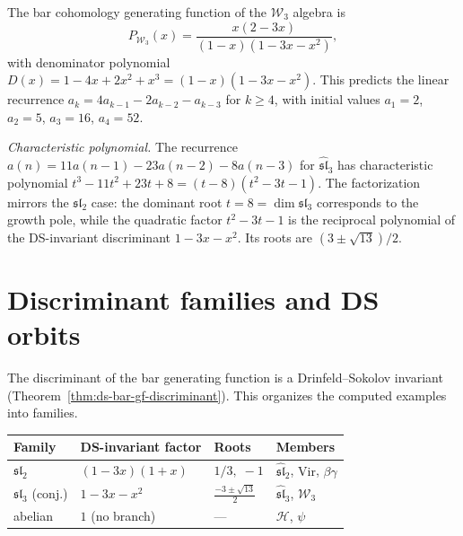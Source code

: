 \begin{conjecture}\label{conj:w3-bar-gf}
The bar cohomology generating function of the $\mathcal{W}_3$ algebra is
\[
P_{\mathcal{W}_3}(x) = \frac{x(2-3x)}{(1-x)(1-3x-x^2)},
\]
with denominator polynomial $D(x) = 1 - 4x + 2x^2 + x^3 = (1-x)(1-3x-x^2)$.  This predicts the linear recurrence $a_k = 4a_{k-1} - 2a_{k-2} - a_{k-3}$ for $k \geq 4$, with initial values $a_1 = 2$, $a_2 = 5$, $a_3 = 16$, $a_4 = 52$.
\end{conjecture}

\emph{Characteristic polynomial.}
The recurrence $a(n) = 11a(n{-}1) - 23a(n{-}2) - 8a(n{-}3)$ for $\widehat{\mathfrak{sl}}_3$ has characteristic polynomial $t^3 - 11t^2 + 23t + 8 = (t-8)(t^2-3t-1)$.  The factorization mirrors the $\mathfrak{sl}_2$ case: the dominant root $t = 8 = \dim\mathfrak{sl}_3$ corresponds to the growth pole, while the quadratic factor $t^2 - 3t - 1$ is the reciprocal polynomial of the DS-invariant discriminant $1 - 3x - x^2$.  Its roots are $(3 \pm \sqrt{13})/2$.

\section{Discriminant families and DS orbits}
\label{sec:discriminant-families}

The discriminant of the bar generating function is a Drinfeld--Sokolov invariant (Theorem~\ref{thm:ds-bar-gf-discriminant}).  This organizes the computed examples into families.

\begin{center}
\renewcommand{\arraystretch}{1.4}
\begin{tabular}{llll}
\toprule
\textbf{Family} & \textbf{DS-invariant factor} & \textbf{Roots} & \textbf{Members} \\
\midrule
$\mathfrak{sl}_2$ & $(1-3x)(1+x)$ & $1/3,\; -1$ & $\widehat{\mathfrak{sl}}_2$, $\mathrm{Vir}$, $\beta\gamma$ \\
$\mathfrak{sl}_3$ (conj.) & $1-3x-x^2$ & $\frac{-3\pm\sqrt{13}}{2}$ & $\widehat{\mathfrak{sl}}_3$, $\mathcal{W}_3$ \\
abelian & $1$ (no branch) & --- & $\mathcal{H}$, $\psi$ \\
\bottomrule
\end{tabular}
\end{center}

